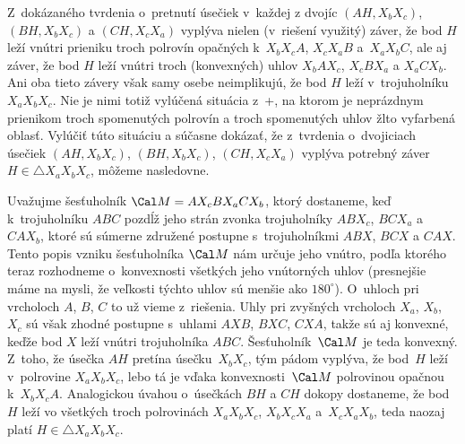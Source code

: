 {\Pozn
Z~dokázaného tvrdenia o~pretnutí úsečiek v~každej z dvojíc
$(AH,X_bX_c)$, $(BH,X_bX_c)$ a $(CH,X_cX_a)$ vyplýva nielen (v~riešení
využitý) záver, že bod $H$ leží vnútri prieniku troch polrovín
opačných k~$X_bX_cA$, $X_cX_aB$ a~$X_aX_bC$, ale aj
záver, že bod $H$ leží vnútri troch (konvexných) uhlov
$X_bAX_c$, $X_cBX_a$ a $X_aCX_b$.
Ani oba tieto závery však samy osebe neimplikujú, že bod $H$ leží
v~trojuholníku $X_aX_bX_c$. Nie je nimi totiž vylúčená situácia
z~+\obr, na ktorom je neprázdnym prienikom troch spomenutých polrovín
a troch spomenutých uhlov žlto vyfarbená oblasť.
%
Vylúčiť túto situáciu a súčasne dokázať, že z~tvrdenia
o~dvojiciach úsečiek $(AH,X_bX_c)$, $(BH,X_bX_c)$, $(CH,X_cX_a)$
vyplýva potrebný záver $H\in\triangle X_aX_bX_c$, môžeme nasledovne.

Uvažujme šesťuholník ${\Cal M}=AX_cBX_aCX_b$, ktorý dostaneme, keď
k~trojuholníku $ABC$ pozdĺž jeho strán  zvonka trojuholníky $ABX_c$, $BCX_a$ a $CAX_b$, ktoré sú súmerne
združené postupne s~trojuholníkmi $ABX$, $BCX$ a $CAX$. Tento popis vzniku
šesťuholníka $\Cal M$ nám určuje jeho vnútro, podľa ktorého
teraz rozhodneme o~konvexnosti všetkých jeho vnútorných uhlov (presnejšie
máme na mysli, že veľkosti týchto uhlov sú menšie ako
$180^{\circ}$). O~uhloch pri vrcholoch $A$, $B$, $C$ to už vieme
z~riešenia. Uhly pri zvyšných vrcholoch $X_a$, $X_b$, $X_c$ sú však zhodné postupne
s~uhlami $AXB$, $BXC$, $CXA$, takže sú aj konvexné, keďže bod $X$ leží
vnútri trojuholníka $ABC$. Šesťuholník~$\Cal M$ je teda konvexný.
Z~toho, že úsečka $AH$ pretína úsečku~$X_bX_c$, tým pádom vyplýva,
že bod~$H$ leží v~polrovine $X_aX_bX_c$, lebo tá je vďaka
konvexnosti~$\Cal M$ polrovinou opačnou k~$X_bX_cA$. Analogickou
úvahou o~úsečkách $BH$ a $CH$ dokopy dostaneme, že bod $H$
leží vo všetkých troch polrovinách $X_aX_bX_c$, $X_bX_cX_a$ a~$X_cX_aX_b$,
teda naozaj platí $H\in\triangle X_aX_bX_c$.
}

